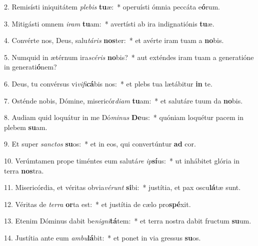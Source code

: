 2. Remisísti iniquitátem \textit{ple}\textit{bis} \textbf{tu}æ:~*  operuísti ómnia peccáta e\textbf{ó}rum.\

3. Mitigásti omnem \textit{i}\textit{ram} \textbf{tu}am:~*  avertísti ab ira indignatiónis \textbf{tu}æ.\

4. Convérte nos, Deus, salu\textit{tá}\textit{ris} \textbf{nos}ter:~*  et avérte iram tuam a \textbf{no}bis.\

5. Numquid in ætérnum ira\textit{scé}\textit{ris} \textbf{no}bis?~*  aut exténdes iram tuam a generatióne in generati\textbf{ó}nem?\

6. Deus, tu convérsus vi\textit{vi}\textit{fi}\textbf{cá}bis nos:~*  et plebs tua lætábitur \textbf{in} te.\

7. Osténde nobis, Dómine, misericór\textit{di}\textit{am} \textbf{tu}am:~*  et salutáre tuum da \textbf{no}bis.\

8. Audiam quid loquátur in me Dó\textit{mi}\textit{nus} \textbf{De}us:~*  quóniam loquétur pacem in plebem \textbf{su}am.\

9. Et super \textit{sanc}\textit{tos} \textbf{su}os:~*  et in eos, qui convertúntur \textbf{ad} cor.\

10. Verúmtamen prope timéntes eum salutá\textit{re} \textit{ip}\textbf{sí}us:~*  ut inhábitet glória in terra \textbf{nos}tra.\

11. Misericórdia, et véritas obvia\textit{vé}\textit{runt} \textbf{si}bi:~*  justítia, et pax oscu\textbf{lá}tæ sunt.\

12. Véritas de \textit{ter}\textit{ra} \textbf{or}ta est:~*  et justítia de cælo pro\textbf{spé}xit.\

13. Etenim Dóminus dabit be\textit{ni}\textit{gni}\textbf{tá}tem:~*  et terra nostra dabit fructum \textbf{su}um.\

14. Justítia ante eum \textit{am}\textit{bu}\textbf{lá}bit:~*  et ponet in via gressus \textbf{su}os.\


